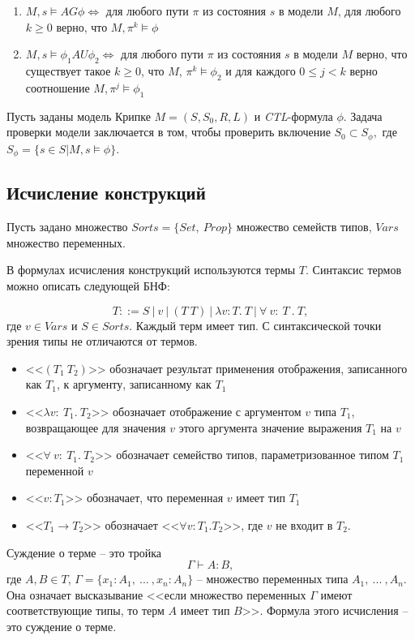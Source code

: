 \documentclass[12pt]{article}
\begin{document}
\begin{enumerate}
    \item $M, s \vDash AG\phi \Leftrightarrow$ для любого пути $\pi$ из состояния $s$ в модели $M$, для любого $k \geq 0$ верно, что $M, \pi^{k} \vDash \phi$ 
    
    \item $M, s \vDash \phi_1 AU \phi_2 \Leftrightarrow$ для любого пути $\pi$ из состояния $s$ в модели $M$ верно, что существует такое $k \geq 0$, что $M$, $\pi^{k} \vDash \phi_2$ и для каждого $0 \leq j < k$ верно соотношение $M, \pi^{j} \vDash \phi_1$
    
\end{enumerate}

Пусть заданы модель Крипке $M = (S, S_0, R, L)$ и \textit{CTL}-формула $\phi$. Задача проверки модели заключается в том, чтобы проверить включение $S_0 \subset S_{\phi},$ где $S_{\phi} = \{s \in S | M,s \vDash \phi \}$. 


\subsection{Исчисление конструкций}
Пусть задано множество $Sorts=\{Set,\ Prop\}$ множество семейств типов, $Vars$ множество переменных.

В формулах исчисления конструкций используются термы $T$.
Синтаксис термов можно описать следующей БНФ:

$$T ::= S\ |\ v\ |\ (T\ T)\ |\ \lambda v :T.\ T\ |\ \forall\ v:\ T\ .\ T,$$
где $v \in Vars$ и $S \in Sorts$. Каждый терм имеет тип. С синтаксической точки зрения типы не отличаются от термов. 

\begin{itemize}
    \item <<$(T_1\ T_2)$>> обозначает результат применения отображения, записанного как $T_1$, к аргументу, записанному как $T_1$
    \item <<$\lambda v:\ T_1.\ T_2$>> обозначает отображение с аргументом $v$ типа $T_1$, возвращающее для значения $v$ этого аргумента значение выражения $T_1$ на $v$
    \item <<$\forall\ v:\ T_1.\ T_2$>> обозначает семейство типов, параметризованное типом $T_1$ переменной $v$
    \item <<$v:T_1$>> обозначает, что переменная $v$ имеет тип $T_1$
    \item <<$T_1 \xrightarrow{} T_2$>> обозначает <<$\forall v:T_1. T_2$>>, где $v$ не входит в $T_2$.
\end{itemize}

Суждение о терме -- это тройка
$$\Gamma \vdash A:B,$$
где $A, B \in T$, $\Gamma= \{x_1:A_1,\ ...\ , x_n:A_n\}$ -- множество переменных типа $A_1,\ ...\ , A_n$.
Она означает высказывание <<если множество переменных $\Gamma$ имеют соответствующие типы, то терм $A$ имеет тип $B$>>.
Формула этого исчисления -- это суждение о терме.
\end{document}
